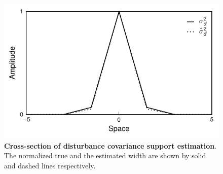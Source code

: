 \documentclass[]{article}
\begin{document}
\begin{figure}[!ht]
\begin{center}
\centering
\includegraphics[scale=1]{./Figures/DisturbanceWidthEstimationCrossSection.pdf}
\end{center}
\caption{{\bf Cross-section of disturbance covariance support estimation}. The normalized true and the estimated width are shown by solid and dashed lines respectively.}
\label{fig:DisturbanceWidthEstimationCrossSection}
\end{figure}
\end{document}
